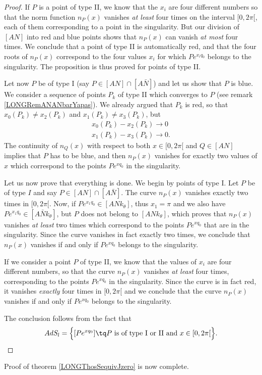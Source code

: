 \begin{proof}
If $P$ is a point of type II, we know that the $x_i$ are four different numbers so that the norm function $n_P(x)$ vanishes \emph{at least} four times on the interval $\mathopen[ 0 , 2\pi [$, each of them corresponding to a point in the singularity. But our division of $[AN]$ into red and blue points shows that $n_P(x)$ can vanish \emph{at most} four times. We conclude that a point of type II is automatically red, and that the four roots of $n_P(x)$ correspond to the four values $x_i$ for which $P e^{x_iq_0}$ belongs to the singularity. The proposition is thus proved for points of type II.

Let now $P$ be of type I (say $P\in [AN]\cap [A\bar N]$) and let us show that $P$ is blue. We consider a sequence of points $P_k$ of type II which converges to $P$ (see remark \ref{LONGRemANANbarYapas}). We already argued that $P_k$ is red, so that $x_0(P_k)\neq x_2(P_k)$ and $x_1(P_k)\neq x_3(P_k)$, but
\begin{subequations}
	\begin{align}
		x_0(P_k)-x_2(P_k)\to 0\\
		x_1(P_k)-x_3(P_k)\to 0.
	\end{align}
\end{subequations}
The continuity of $n_Q(x)$ with respect to both $x\in\mathopen[ 0 , 2\pi [$ and $Q\in[AN]$ implies that $P$ has to be blue, and then $n_P(x)$ vanishes for exactly two values of $x$ which correspond to the points $P e^{xq_0}$ in the singularity.

Let us now prove that everything is done. We begin by points of type I. Let $P$ be of type $I$ and say $P\in[AN]\cap[A\bar N]$. The curve $n_P(x)$ vanishes exactly two times in $\mathopen[ 0 , 2\pi [$. Now, if $P e^{x_1 q_0}\in[ANk_{\theta}]$, thus $x_1 = \pi$ and we also have $P e^{x_1q_0}\in[A\bar Nk_{\theta}]$, but $P$ does not belong to $[ANk_{\theta}]$, which proves that $n_P(x)$ vanishes \emph{at least} two times which correspond to the points $P e^{xq_0}$ that are in the singularity. Since the curve vanishes in fact exactly two times, we conclude that $n_P(x)$ vanishes if and only if $P e^{xq_0}$ belongs to the singularity.

If we consider a point $P$ of type II, we know that the values of $x_i$ are four different numbers, so that the curve $n_P(x)$ vanishes \emph{at least} four times, corresponding to the points $P e^{xq_0}$ in the singularity. Since the curve is in fact red, it vanishes \emph{exactly} four times in $\mathopen[ 0 , 2\pi [$ and we conclude that the curve $n_P(x)$ vanishes if and only if $P e^{xq_0}$ belongs to the singularity.

The conclusion follows from the fact that 
\begin{equation}
	AdS_l=\Big\{ [P e^{xq_0}] \tq \text{$P$ is of type I or II and $x\in\mathopen[ 0 , 2\pi [$} \Big\}.
\end{equation}

\end{proof}
Proof of theorem \ref{LONGThosSequivJzero} is now complete.


